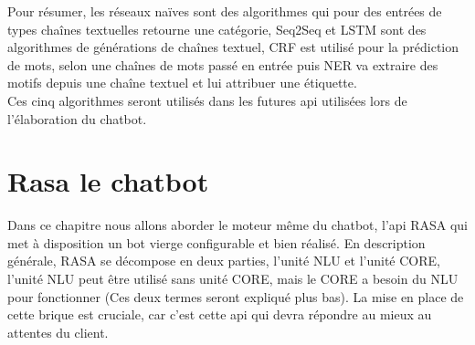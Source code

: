 \pagebreak

Pour résumer, les réseaux naïves sont des algorithmes qui pour des entrées de types chaînes textuelles retourne une catégorie, Seq2Seq et LSTM sont des algorithmes de générations de chaînes textuel, CRF est utilisé pour la prédiction de mots, selon une chaînes de mots passé en entrée puis NER va extraire des motifs depuis une chaîne textuel et lui attribuer une étiquette.\\
\linebreak
Ces cinq algorithmes seront utilisés dans les futures api utilisées lors de l'élaboration du chatbot.\\
\pagebreak

\chapter{Rasa le chatbot}

Dans ce chapitre nous allons aborder le moteur même du chatbot, l'api RASA qui met à disposition un bot vierge configurable et bien réalisé. \linebreak
En description générale, RASA se décompose en deux parties, l'unité NLU et l'unité CORE, l'unité NLU peut être utilisé sans unité CORE, mais le CORE a besoin du NLU pour fonctionner (Ces deux termes seront expliqué plus bas).
La mise en place de cette brique est cruciale, car c'est cette api qui devra répondre au mieux au attentes du client.

\pagebreak
